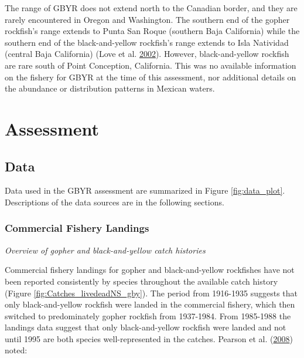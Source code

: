\documentclass[12pt,]{article}
\begin{document}
The range of GBYR does not extend north to the Canadian border, and they
are rarely encountered in Oregon and Washington. The southern end of the
gopher rockfish's range extends to Punta San Roque (southern Baja
California) while the southern end of the black-and-yellow rockfish's
range extends to Isla Natividad (central Baja California) (Love et al.
\protect\hyperlink{ref-Love2002}{2002}). However, black-and-yellow
rockfish are rare south of Point Conception, California. This was no
available information on the fishery for GBYR at the time of this
assessment, nor additional details on the abundance or distribution
patterns in Mexican waters.

\section{Assessment}\label{assessment}

\subsection{Data}\label{data}

Data used in the GBYR assessment are summarized in Figure
\ref{fig:data_plot}. Descriptions of the data sources are in the
following sections.

\subsubsection{Commercial Fishery
Landings}\label{commercial-fishery-landings}

\emph{Overview of gopher and black-and-yellow catch histories}

Commercial fishery landings for gopher and black-and-yellow rockfishes
have not been reported consistently by species throughout the available
catch history (Figure \ref{fig:Catches_livedeadNS_gby}). The period from
1916-1935 suggests that only black-and-yellow rockfish were landed in
the commercial fishery, which then switched to predominately gopher
rockfish from 1937-1984. From 1985-1988 the landings data suggest that
only black-and-yellow rockfish were landed and not until 1995 are both
species well-represented in the catches. Pearson et al.
(\protect\hyperlink{ref-Pearson2008}{2008}) noted:
\end{document}
